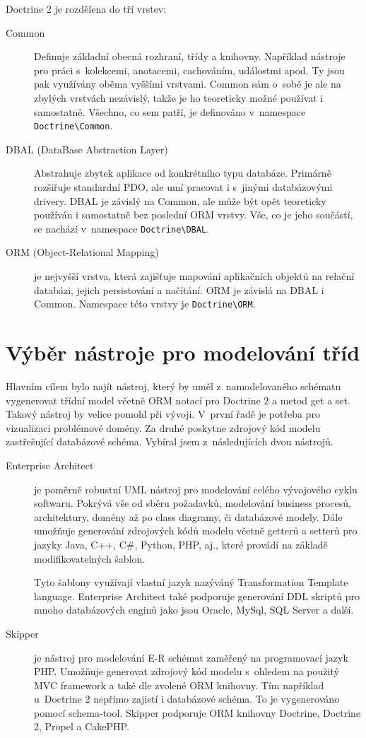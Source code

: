 \documentclass[thesis=B,czech]{FITthesis}[2012/06/26]
\begin{document}
	Doctrine 2 je rozdělena do tří vrstev:
	\begin{description}
		\item[Common] Definuje základní obecná rozhraní, třídy a knihovny. Například nástroje pro práci s~kolekcemi, anotacemi, cachováním, událostmi apod. Ty jsou pak využívány oběma vyššími vrstvami. Common sám o~sobě je ale na zbylých vrstvách nezávislý, takže je ho teoreticky možné používat i samostatně. Všechno, co sem patří, je definováno v~namespace \verb|Doctrine\Common|.
		\item[DBAL (DataBase Abstraction Layer)] Abstrahuje zbytek aplikace od konkrétního typu databáze. Primárně rozšiřuje standardní PDO, ale umí pracovat i s~jinými databázovými drivery. DBAL je závislý na Common, ale může být opět teoreticky používán i samostatně bez poslední ORM vrstvy. Vše, co je jeho součástí, se nachází v~namespace \verb|Doctrine\DBAL|.
		\item[ORM (Object-Relational Mapping)] je nejvyšší vrstva, která zajišťuje mapování aplikačních objektů na relační databázi, jejich persistování a načítání. ORM je závislá na DBAL i Common. Namespace této vrstvy je \verb|Doctrine\ORM|.\cite{doctrine2}
	\end{description}

\section{Výběr nástroje pro modelování tříd}
	Hlavním cílem bylo najít nástroj, který by uměl z~namodelovaného schématu vygenerovat třídní model včetně ORM notací pro Doctrine 2 a metod get a set. Takový nástroj by velice pomohl při vývoji. V~první řadě je potřeba pro vizualizaci problémové domény. Za druhé poskytne zdrojový kód modelu zastřešující databázové schéma. Vybíral jsem z~následujících dvou nástrojů.

\begin{description}
	\item[Enterprise Architect]
	je poměrně robustní UML nástroj pro modelování celého vývojového cyklu softwaru. Pokrývá vše od sběru požadavků, modelování business procesů, architektury, domény až po class diagramy, či databázové modely. Dále umožňuje generování zdrojových kódů modelu včetně getterů a setterů pro jazyky Java, C++, C\#, Python, PHP, aj., které provádí na základě modifikovatelných šablon.
	
	Tyto šablony využívají vlastní jazyk nazýváný Transformation Template language. Enterprise Architect také podporuje generování DDL skriptů pro mnoho databázových enginů jako jsou Oracle, MySql, SQL Server a další.\cite{enterprise_architect}

	\item[Skipper\cite{skipper}]
	je nástroj pro modelování E-R schémat zaměřený na programovací jazyk PHP. Umožňuje generovat zdrojový kód modelu s~ohledem na použitý MVC framework a také dle zvolené ORM knihovny. Tím například u~Doctrine 2 nepřímo zajistí i databázové schéma. To je vygenerováno pomocí schema-tool. Skipper podporuje ORM knihovny Doctrine, Doctrine 2, Propel a CakePHP.\cite{skipper_features}
\end{description}
\end{document}

